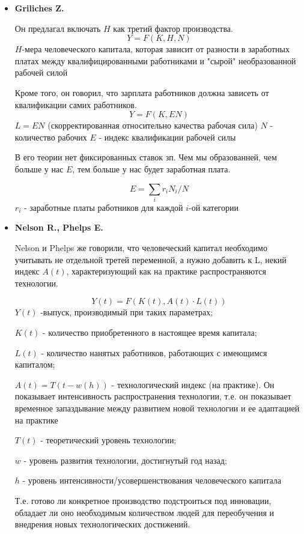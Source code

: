 \documentclass[reqno]{article}
\theoremstyle{definition}
\theoremstyle{definition}
\theoremstyle{definition}
\theoremstyle{definition}
\theoremstyle{definition}
\theoremstyle{definition}
\theoremstyle{definition}
\theoremstyle{definition}
\theoremstyle{definition}
\begin{document}
			\begin{itemize}
				\item \textbf{Griliches Z.}
				
					Он предлагал включать $H$ как третий фактор производства. 
					$$Y = F(K,H,N)$$
					$H$-мера человеческого капитала, которая зависит от разности в заработных платах между квалифицированными работниками и "сырой" необразованной рабочей силой
					
					Кроме того, он говорил, что зарплата работников должна зависеть от квалификации самих работников.
					$$Y = F(K,EN)$$
					$L = EN$ (скорректированная относительно качества рабочая сила)
					$N$ - количество рабочих
					$E$ - индекс квалификации рабочей силы 
					
					В его теории нет фиксированных ставок зп. Чем  мы образованней, чем больше у нас $E$, тем больше у нас будет заработная плата.
					
					$$E = \sum_i r_i N_i/N$$
					$r_i$ - заработные платы работников для каждой $i$-ой категории
					
				\item \textbf{Nelson R., Phelps E.}
				
					Nelson и Phelps же говорили, что человеческий капитал необходимо учитывать не отдельной третей переменной, а нужно добавить к L, некий индекс $A(t)$, характеризующий как на практике распространяются технологии.
					
					$$Y(t) = F \left(K(t),A(t) \cdot L(t)\right)$$
					$Y(t)$ -выпуск, производимый при таких параметрах;
					
					$K(t)$ - количество приобретенного в настоящее время капитала;
					
					$L(t)$ - количество нанятых работников, работающих с имеющимся капиталом;
					
					$A(t) = T(t-w(h))$ - технологический индекс (на практике). Он показывает интенсивность распространения технологии, т.е. он показывает временное запаздывание между развитием новой технологии и ее адаптацией на практике
					
					\setlength{\leftskip}{2em}
					$T(t)$ - теоретический уровень технологии;
					
					$w$ - уровень развития технологии, достигнутый год назад;
					
					$h$ -  уровень интенсивности/усовершенствования человеческого капитала
					
					\setlength{\leftskip}{0em}
					Т.е. готово ли конкретное производство подстроиться под инновации, обладает ли оно необходимым количеством людей для переобучения и внедрения новых технологических достижений.
					

\end{itemize}
\end{document}
